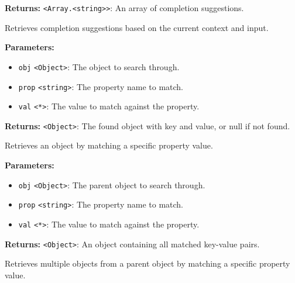 \documentclass[12pt,a4paper]{article}
\begin{document}
\noindent \textbf{Returns:} \texttt{<Array.<string>>}: An array of completion suggestions.

\noindent Retrieves completion suggestions based on the current context and input.

\vspace{5mm}
\noindent {}


\noindent \textbf{Parameters:}
\begin{itemize}
  \item \texttt{obj} \texttt{<Object>}: The object to search through.
  \item \texttt{prop} \texttt{<string>}: The property name to match.
  \item \texttt{val} \texttt{<*>}: The value to match against the property.
\end{itemize}

\noindent \textbf{Returns:} \texttt{<Object>}: The found object with key and value, or null if not found.

\noindent Retrieves an object by matching a specific property value.

\vspace{5mm}
\noindent {}


\noindent \textbf{Parameters:}
\begin{itemize}
  \item \texttt{obj} \texttt{<Object>}: The parent object to search through.
  \item \texttt{prop} \texttt{<string>}: The property name to match.
  \item \texttt{val} \texttt{<*>}: The value to match against the property.
\end{itemize}

\noindent \textbf{Returns:} \texttt{<Object>}: An object containing all matched key-value pairs.

\noindent Retrieves multiple objects from a parent object by matching a specific property value.

\vspace{5mm}
\noindent {}
\end{document}
